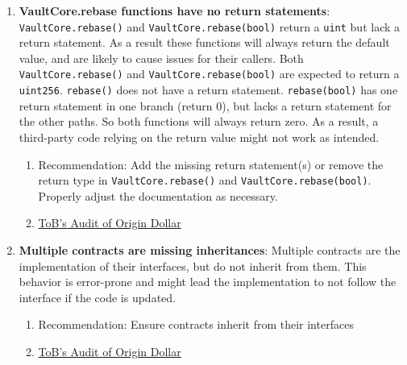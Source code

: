 \begin{enumerate}
\item\textbf{VaultCore.rebase functions have no return statements}: \verb|VaultCore.rebase()| and \verb|VaultCore.rebase(bool)| return a \verb|uint| but lack a return statement. As a result these functions will always return the default value, and are likely to cause issues for their callers. Both \verb|VaultCore.rebase()| and \verb|VaultCore.rebase(bool)| are expected to return a \verb|uint256|. \verb|rebase()| does not have a return statement. \verb|rebase(bool)| has one return statement in one branch (return 0), but lacks a return statement for the other paths. So both functions will always return zero. As a result, a third-party code relying on the return value might not work as intended.
	\begin{enumerate}
	\item Recommendation: Add the missing return statement(s) or remove the return type in \verb|VaultCore.rebase()| and \verb|VaultCore.rebase(bool)|. Properly adjust the documentation as necessary.
	\item\href{https://github.com/trailofbits/publications/blob/master/reviews/OriginDollar.pdf}{ToB's Audit of Origin Dollar}
	\end{enumerate}

\item\textbf{Multiple contracts are missing inheritances}: Multiple contracts are the implementation of their interfaces, but do not inherit from them. This behavior is error-prone and might lead the implementation to not follow the interface if the code is updated.
	\begin{enumerate}
	\item Recommendation: Ensure contracts inherit from their interfaces
	\item\href{https://github.com/trailofbits/publications/blob/master/reviews/OriginDollar.pdf}{ToB's Audit of Origin Dollar}
	\end{enumerate}


\end{enumerate}
